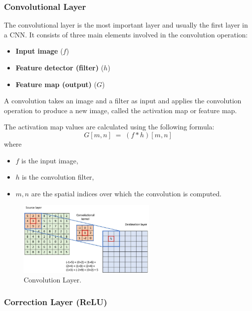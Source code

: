 \subsubsection{Convolutional Layer}
\label{sec:conv}

The convolutional layer is the most important layer and usually the first layer in a CNN. It consists of three main elements involved in the convolution operation:
\begin{itemize}
  \item \textbf{Input image} ($f$)
  \item \textbf{Feature detector (filter)} ($h$)
  \item \textbf{Feature map (output)} ($G$)
\end{itemize}

A convolution takes an image and a filter as input and applies the convolution operation to produce a new image, called the activation map or feature map.

The activation map values are calculated using the following formula:
\begin{equation}
  G[m,n] \;=\; (f * h)[m,n]
\end{equation}
where
\begin{itemize}
  \item $f$ is the input image,
  \item $h$ is the convolution filter,
  \item $m,n$ are the spatial indices over which the convolution is computed.

\end{itemize}
\begin{figure}[H]
  \centering
  \includegraphics[width=0.6\textwidth]{Images/Chapter1/conv.png}
  \caption{Convolution Layer.}
  \label{fig:conv}
\end{figure}

\subsubsection{Correction Layer (ReLU)}

